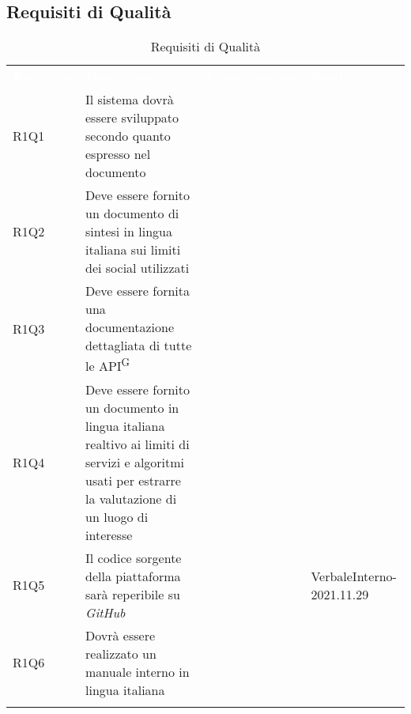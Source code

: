 \subsection{Requisiti di Qualità}


\renewcommand{\arraystretch}{1.5}
\begin{longtable}{ m{}<{\centering}  m{}<{\centering}  m{}<{\centering}  m{}<{\centering}}
	\rowcolor{darkblue}
	\textcolor{white}{\textbf{Requisito}} &\textcolor{white}{\textbf{Descrizione}}& \textcolor{white}{\textbf{Classificazione}} & \textcolor{white}{\textbf{Fonti}}\\ 

	R1Q1 & Il sistema dovrà essere sviluppato secondo quanto espresso nel documento \textit{\NdP} & \Ob & \Di \\
	
	R1Q2 & Deve essere fornito un documento di sintesi in lingua italiana sui limiti dei social utilizzati & \Ob & \Ca \\
	
	R1Q3 & Deve essere fornita una documentazione dettagliata di tutte le API\textsuperscript{G} & \Ob & \Ca \\

	R1Q4 & Deve essere fornito un documento in lingua italiana realtivo ai limiti di servizi e algoritmi usati per estrarre la valutazione di un luogo di interesse & \Ob & \Ca \\

	R1Q5 & Il codice sorgente della piattaforma sarà reperibile su \textit{GitHub} & \Ob & VerbaleInterno-2021.11.29 \\
	
	R1Q6 & Dovrà essere realizzato un manuale interno in lingua italiana  & \Ob & \Di \\

	\hiderowcolors \caption{Requisiti di Qualità}
\end{longtable}

\clearpage